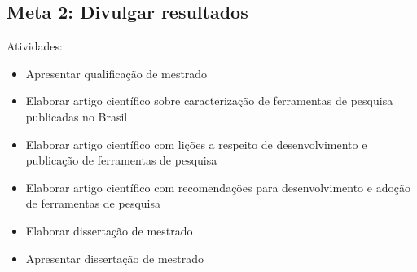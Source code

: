 \documentclass[12pt]{article}
\begin{document}
\subsection{Meta 2: Divulgar resultados}

Atividades:

\begin{itemize}
  \item Apresentar qualificação de mestrado
  \item Elaborar artigo científico sobre caracterização de ferramentas de pesquisa publicadas no Brasil
  \item Elaborar artigo científico com lições a respeito de desenvolvimento e publicação de ferramentas de pesquisa
  \item Elaborar artigo científico com recomendações para desenvolvimento e adoção de ferramentas de pesquisa
  \item Elaborar dissertação de mestrado
  \item Apresentar dissertação de mestrado
\end{itemize}


\end{document}

